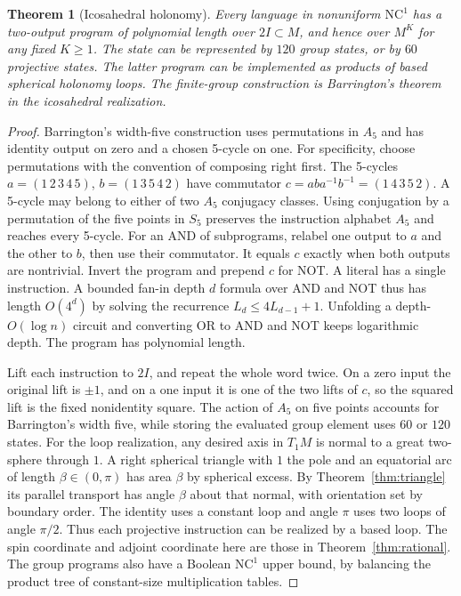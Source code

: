 \documentclass[11pt,reqno]{amsart}
\newtheorem{theorem}{Theorem}[section]
\theoremstyle{definition}
\theoremstyle{remark}
\numberwithin{equation}{section}
\begin{document}
\begin{theorem}[Icosahedral holonomy]\label{m6:barrington}
Every language in nonuniform \(\mathrm{NC}^1\) has a two-output
program of polynomial length over \(2I\subset M\), and hence over \(M^K\)
for any fixed \(K\ge1\). The state can be represented by \(120\)
group states, or by \(60\) projective states. The latter program
can be implemented as products of based spherical holonomy loops.
The finite-group construction is Barrington's theorem
\cite{m6:Barrington} in the icosahedral realization.
\end{theorem}
\begin{proof}
Barrington's width-five construction uses permutations in
\(A_5\) and has identity output on zero and a chosen 5-cycle
on one. For specificity, choose permutations with the convention
of composing right first. The 5-cycles \(a=(1\,2\,3\,4\,5)\),
\(b=(1\,3\,5\,4\,2)\) have commutator
\(c=aba^{-1}b^{-1}=(1\,4\,3\,5\,2)\).
A 5-cycle may belong to either of two \(A_5\) conjugacy classes.
Using conjugation by a permutation of the five points in \(S_5\)
preserves the instruction alphabet \(A_5\) and reaches every
5-cycle. For an AND of subprograms, relabel one output to \(a\)
and the other to \(b\), then use their commutator. It equals
\(c\) exactly when both outputs are nontrivial. Invert the
program and prepend \(c\) for NOT. A literal has a single
instruction. A bounded fan-in depth \(d\) formula over AND
and NOT thus has length \(O(4^d)\) by solving the recurrence
\(L_d\le4L_{d-1}+1\). Unfolding a depth-\(O(\log n)\) circuit
and converting OR to AND and NOT keeps logarithmic depth.
The program has polynomial length.

Lift each instruction to \(2I\), and repeat the whole word twice.
On a zero input the original lift is \(\pm1\), and on a one
input it is one of the two lifts of \(c\), so the squared lift
is the fixed nonidentity square. The action of \(A_5\) on
five points accounts for Barrington's width five, while storing
the evaluated group element uses \(60\) or \(120\) states.
For the loop realization, any desired axis in \(T_1M\) is
normal to a great two-sphere through \(1\). A right spherical
triangle with \(1\) the pole and an equatorial arc of length
\(\beta\in(0,\pi)\) has area \(\beta\) by spherical excess.
By Theorem~\ref{thm:triangle} its parallel transport has
angle \(\beta\) about that normal, with orientation set by
boundary order. The identity uses a constant loop and angle
\(\pi\) uses two loops of angle \(\pi/2\).
Thus each projective instruction can be realized by a based loop.
The spin coordinate and adjoint coordinate here are those in
Theorem~\ref{thm:rational}. The group programs also have a
Boolean \(\mathrm{NC}^1\) upper bound, by balancing the product
tree of constant-size multiplication tables.
\end{proof}
\end{document}
